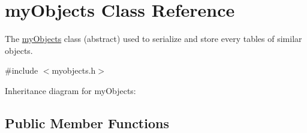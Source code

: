\hypertarget{classmyObjects}{}\section{my\+Objects Class Reference}
\label{classmyObjects}


The \hyperlink{classmyObjects}{my\+Objects} class (abstract) used to serialize and store every tables of similar objects.  




{\ttfamily \#include $<$myobjects.\+h$>$}



Inheritance diagram for my\+Objects\+:
\subsection*{Public Member Functions}
